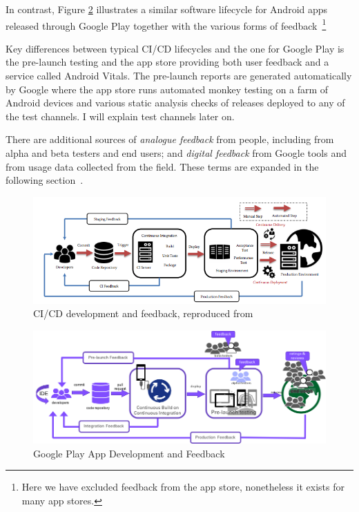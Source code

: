 In contrast, Figure \ref{fig:google-play-app-development-and-feedback} illustrates a similar software lifecycle for Android apps released through Google Play together with the various forms of feedback~\footnote{Here we have excluded feedback from the app store, nonetheless it exists for many app stores.} 

Key differences between typical CI/CD lifecycles and the one for Google Play is the pre-launch testing and the app store providing both user feedback and a service called Android Vitals. The pre-launch reports are generated automatically by Google where the app store runs automated monkey testing on a farm of Android devices and various static analysis checks of releases deployed to any of the test channels. I will explain test channels later on. %

There are additional sources of \emph{analogue feedback} from people, including from alpha and beta testers and end users; and \emph{digital feedback} from Google tools and from usage data collected from the field. These terms are expanded in the following section~\href{analogue-and-digital-feedback}{\emph{}}.


\begin{figure}[ht]
    \centering
    \includegraphics[width=13cm]{images/ci-cd-development-and-feedback.png}
    \caption{CI/CD development and feedback, reproduced from~\cite{shahin2019empirical_study_architecting_cd}}
    \label{fig:ci-cd-development-and-feedback}
\end{figure}

\begin{figure}
    \centering
    \includegraphics[width=13cm]{images/google-play-app-development.png}
    \caption{Google Play App Development and Feedback}
    \label{fig:google-play-app-development-and-feedback}
\end{figure}


